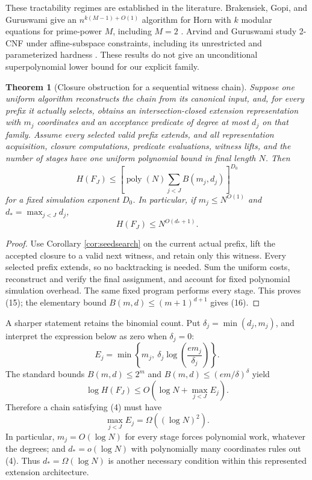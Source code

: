 \documentclass[11pt]{article}
\newtheorem{theorem}{Theorem}
\newcommand{\poly}{\operatorname{poly}}
\begin{document}
These tractability regimes are established in the literature.
Brakensiek, Gopi, and Guruswami give an
$n^{k(M-1)+O(1)}$ algorithm for Horn with $k$ modular equations for
prime-power $M$, including $M=2$ \cite{brakensiek2019}.
Arvind and Guruswami study 2-CNF under affine-subspace constraints,
including its unrestricted and parameterized hardness
\cite{arvind2021}. These results do not give an unconditional
superpolynomial lower bound for our explicit family.

\begin{theorem}[Closure obstruction for a sequential witness chain]\label{thm:chainclosure}
Suppose one uniform algorithm reconstructs the chain from its canonical
input, and, for every prefix it actually selects, obtains an intersection-closed
extension representation with $m_j$ coordinates and an acceptance predicate
of degree at most $d_j$ on that family.
Assume every selected valid prefix extends, and all representation
acquisition, closure computations, predicate evaluations, witness lifts,
and the number of stages have one uniform polynomial bound in final
length $N$. Then
\[
 H(F_J)\le
 \left[\poly(N)\sum_{j<J}B(m_j,d_j)\right]^{D_0}
 \tag{15}
\]
for a fixed simulation exponent $D_0$.
In particular, if $m_j\le N^{O(1)}$ and $d_*=\max_{j<J}d_j$,
\[
 H(F_J)\le N^{O(d_*+1)}.
 \tag{16}
\]
\end{theorem}

\begin{proof}
Use Corollary \ref{cor:seedsearch} on the current actual prefix, lift the
accepted closure to a valid next witness, and retain only this witness.
Every selected prefix extends, so no backtracking is needed.
Sum the uniform costs, reconstruct and verify the final assignment,
and account for fixed polynomial simulation overhead. The same fixed
program performs every stage. This proves (15); the elementary bound
$B(m,d)\le(m+1)^{d+1}$ gives (16).
\end{proof}

A sharper statement retains the binomial count. Put
$\delta_j=\min(d_j,m_j)$, and interpret the expression below as zero
when $\delta_j=0$:
\[
 E_j=\min\left\{m_j,\ 
    \delta_j\log\left(\frac{e m_j}{\delta_j}\right)\right\}.
\]
The standard bounds $B(m,d)\le2^m$ and
$B(m,d)\le(em/\delta)^\delta$ yield
\[
 \log H(F_J)\le O\left(\log N+\max_{j<J} E_j\right).
 \tag{17}
\]
Therefore a chain satisfying (4) must have
\[
 \max_{j<J}E_j=\Omega((\log N)^2).
 \tag{18}
\]
In particular, $m_j=O(\log N)$ for every stage forces polynomial work,
whatever the degrees; and $d_*=o(\log N)$ with polynomially many
coordinates rules out (4). Thus $d_*=\Omega(\log N)$ is another
necessary condition within this represented extension architecture.
\end{document}
